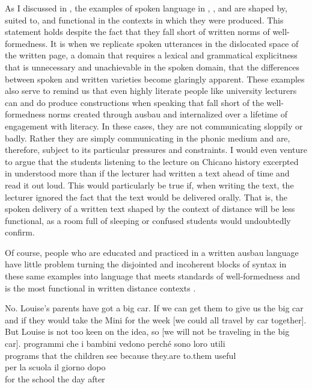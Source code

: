 As I discussed in , the examples of spoken language in , , and  are shaped by, suited to, and functional in the contexts in which they were produced. This statement holds despite the fact that they fall short of written norms of well-formedness. It is when we replicate spoken utterances in the dislocated space of the written page, a domain that requires a lexical and grammatical explicitness that is unnecessary and unachievable in the spoken domain, that the differences between spoken and written varieties become glaringly apparent. These examples also serve to remind us that even highly literate people like university lecturers can and do produce constructions when speaking that fall short of the well-formedness norms created through ausbau and internalized over a lifetime of engagement with literacy. In these cases, they are not communicating sloppily or badly. Rather they are simply communicating in the phonic medium and are, therefore, subject to its particular pressures and constraints. I would even venture to argue that the students listening to the lecture on Chicano history excerpted in  understood more than if the lecturer had written a text ahead of time and read it out loud. This would particularly be true if, when writing the text, the lecturer ignored the fact that the text would be delivered orally. That is, the spoken delivery of a written text shaped by the context of distance will be less functional, as a room full of sleeping or confused students would undoubtedly confirm.

Of course, people who are educated and practiced in a written ausbau language have little problem turning the disjointed and incoherent blocks of syntax in these same examples into language that meets standards of well-formedness and is the most functional in written distance contexts .

\ea%
    \label{ex:7:4}
\ea No. Louise’s parents have got a big car. If we can get them to give us the big car and if they would take the Mini for the week [we could all travel by car together]. But Louise is not too keen on the idea, so [we will not be traveling in the big car].
\ex
\gll programmi  che   i bambini     vedono   perché  sono   loro   utili\\
programs   that  the children  see     because  they.are   to.them   useful\\

\gll per  la scuola   il giorno  dopo\\
for   the school   the day   after\\

